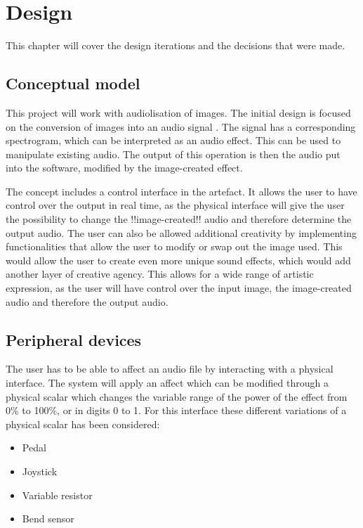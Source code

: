 \chapter{Design}\label{ch:design}
This chapter will cover the design iterations and the decisions that were made. 

\section{Conceptual model}
This project will work with audiolisation of images. The initial design is focused on the conversion of images  into an audio signal . The signal has a corresponding spectrogram, which can be interpreted as an audio effect.  This can be used to manipulate existing audio. The output of this operation is then the audio put into the software, modified by the image-created effect. 

The concept includes a control interface in the artefact. It allows the user to have control over the output in real time, as the physical interface will give the user the possibility to change the !!image-created!! audio and therefore determine the output audio.
The user can also be allowed additional creativity by implementing functionalities that allow the user to modify or swap out the image used. This would allow the user to create even more unique sound effects, which would add another layer of creative agency. This allows for a wide range of artistic expression, as the user will have control over the input image, the image-created audio and therefore the output audio. 

\section{Peripheral devices}
The user has to be able to affect an audio file by interacting with a physical interface. The system will apply an affect which can be modified through a physical scalar which changes the variable range of the power of the effect from 0\% to 100\%, or in digits 0 to 1. For this interface these different variations of a physical scalar has been considered: 

\begin{itemize}
\item Pedal
\item Joystick
\item Variable resistor
\item Bend sensor
\end{itemize}

